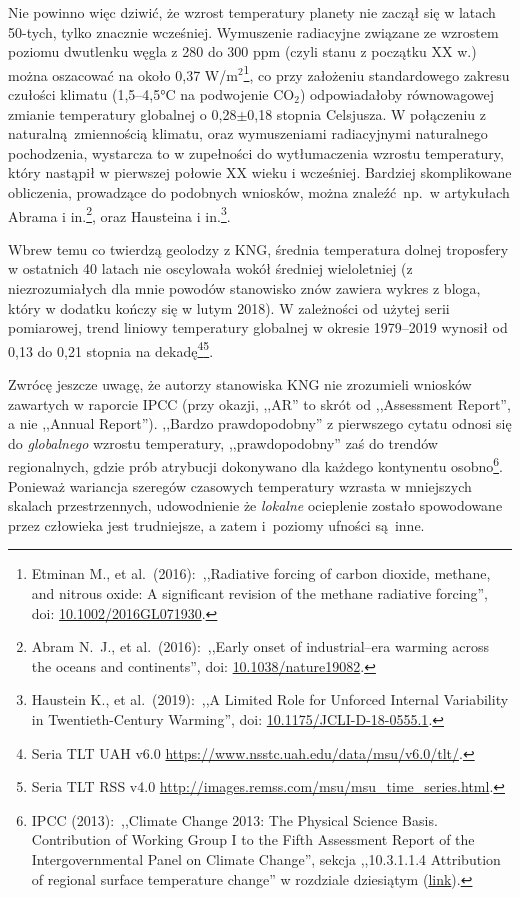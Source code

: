 \documentclass[12pt]{article}
\newcommand{\doi}[1]{doi: \href{htts://doi.org/#1}{#1}}
\begin{document}
Nie powinno więc dziwić, że wzrost temperatury planety nie zaczął się w latach 50-tych, tylko znacznie wcześniej. Wymuszenie radiacyjne związane ze wzrostem poziomu dwutlenku węgla z 280 do 300 ppm (czyli stanu z początku XX w.) można oszacować na około 0{,}37 W/m$^2$\footnote{Etminan M., et al.~(2016):~,,Radiative forcing of carbon dioxide, methane, and nitrous oxide: A significant revision of the methane radiative forcing'', \doi{10.1002/2016GL071930}.}, co przy założeniu standardowego zakresu czułości klimatu (1{,}5--4{,}5\si{\celsius} na podwojenie CO$_2$) odpowiadałoby równowagowej zmianie temperatury globalnej o 0{,}28$\pm$0{,}18 stopnia Celsjusza. W połączeniu z naturalną zmiennością klimatu, oraz wymuszeniami radiacyjnymi naturalnego pochodzenia, wystarcza to w zupełności do wytłumaczenia wzrostu temperatury, który nastąpił w pierwszej połowie XX wieku i wcześniej. Bardziej skomplikowane obliczenia, prowadzące do podobnych wniosków, można znaleźć np.~w artykułach Abrama i in.\footnote{Abram N.~J., et al.~(2016):~,,Early onset of industrial--era warming across the oceans and continents'', \doi{10.1038/nature19082}.}, oraz Hausteina i in.\footnote{Haustein K., et al.~(2019):~,,A Limited Role for Unforced Internal Variability in Twentieth-Century Warming'', \doi{10.1175/JCLI-D-18-0555.1}.}.
		
Wbrew temu co twierdzą geolodzy z KNG, średnia temperatura dolnej troposfery w ostatnich 40 latach nie oscylowała wokół średniej wieloletniej (z niezrozumiałych dla mnie powodów stanowisko znów zawiera wykres z bloga, który w dodatku kończy się w lutym 2018). W zależności od użytej serii pomiarowej, trend liniowy temperatury globalnej w okresie 1979--2019 wynosił od 0{,}13 do 0{,}21 stopnia na dekadę\footnote{Seria TLT UAH v6{.}0 \url{https://www.nsstc.uah.edu/data/msu/v6.0/tlt/}.}\footnote{Seria TLT RSS v4{.}0 \url{http://images.remss.com/msu/msu\_time\_series.html}.}.
		
Zwrócę jeszcze uwagę, że autorzy stanowiska KNG nie zrozumieli wniosków zawartych w raporcie IPCC (przy okazji, ,,AR'' to skrót od ,,Assessment Report'', a nie ,,Annual Report''). ,,Bardzo prawdopodobny'' z pierwszego cytatu odnosi się do \emph{globalnego} wzrostu temperatury, ,,prawdopodobny'' zaś do trendów regionalnych, gdzie prób atrybucji dokonywano dla każdego kontynentu osobno\footnote{IPCC (2013):~,,Climate Change 2013: The Physical Science Basis. Contribution of Working Group I to the Fifth Assessment Report of the Intergovernmental Panel on Climate Change'', sekcja ,,10.3.1.1.4 Attribution of regional surface temperature change'' w rozdziale dziesiątym (\href{https://www.ipcc.ch/site/assets/uploads/2018/02/WG1AR5\_Chapter10\_FINAL.pdf}{link}).}. Ponieważ wariancja szeregów czasowych temperatury wzrasta w mniejszych skalach przestrzennych, udowodnienie że \emph{lokalne} ocieplenie zostało spowodowane przez człowieka jest trudniejsze, a zatem i~poziomy ufności są inne.
\end{document}
